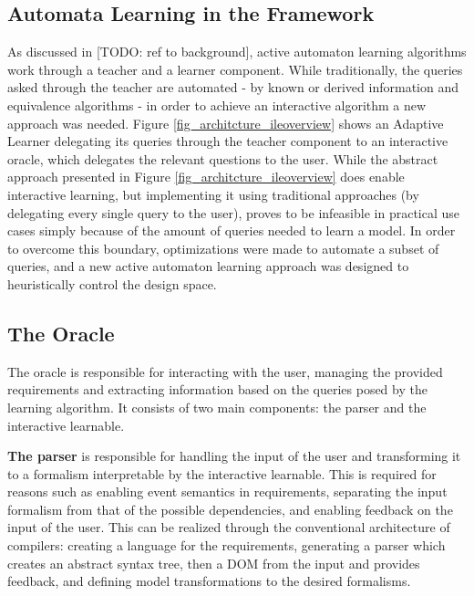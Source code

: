 \subsection{Automata Learning in the Framework} \label{subs_automatalearningintheframework}
As discussed in [TODO: ref to background], active automaton learning algorithms work through a teacher and a learner component. While traditionally, the queries asked through the teacher are automated - by known or derived information and equivalence algorithms - in order to achieve an interactive algorithm a new approach was needed. Figure \ref{fig_architcture_ileoverview} shows an Adaptive Learner delegating its queries through the teacher  component to an interactive oracle, which delegates the relevant questions to the user. While the abstract approach presented in Figure \ref{fig_architcture_ileoverview} does enable interactive learning, but implementing it using traditional approaches (by delegating every single query to the user), proves to be infeasible in practical use cases simply because of the amount of queries needed to learn a model. In order to overcome this boundary, optimizations were made to automate a subset of queries, and a new active automaton learning approach was designed to heuristically control the design space.

\subsection{The Oracle} \label{subs_oracle}
The oracle is responsible for interacting with the user, managing the provided requirements and extracting information based on the queries posed by the learning algorithm. It consists of two main components: the parser and the interactive learnable.

\textbf{The parser} is responsible for handling the input of the user and transforming it to a formalism interpretable by the interactive learnable. This is required for reasons such as enabling event semantics in requirements, separating the input formalism from that of the possible dependencies, and enabling feedback on the input of the user. This can be realized through the conventional architecture of compilers: creating a language for the requirements, generating a parser which creates an abstract syntax tree, then a DOM from the input and provides feedback, and defining model transformations to the desired formalisms.

